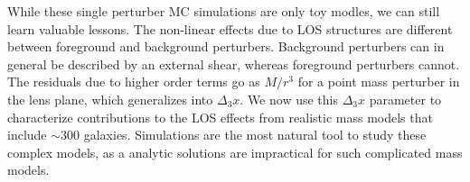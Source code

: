 While these single perturber MC simulations are only toy modles, we can still learn valuable lessons. The non-linear effects due to LOS structures are different between foreground and background perturbers. Background perturbers can in general be described by an external shear, whereas foreground perturbers cannot. The residuals due to higher order terms go as $M / r^3$ for a point mass perturber in the lens plane, which generalizes into $\Delta_3 x$. We now use this $\Delta_3x$ parameter to characterize contributions to the LOS effects from realistic mass models that include $\sim 300$ galaxies. Simulations are the most natural tool to study these complex models, as a analytic solutions are impractical for such complicated mass models.